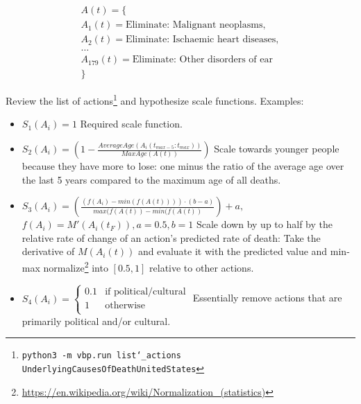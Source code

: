 \documentclass[12pt, a4paper, twocolumn]{article}
\begin{document}
\begin{equation*}
  \begin{gathered}
    A(t) = \{\\
    A_1(t) = \textrm{Eliminate: Malignant neoplasms},\\
    A_2(t) = \textrm{Eliminate: Ischaemic heart diseases},\\
    \textrm{\ldots}\\
    A_{179}(t) = \textrm{Eliminate: Other disorders of ear}\\
    \}
  \end{gathered}
\end{equation*}

Review the list of actions\footnote{\texttt{python3 -m vbp.run list\char`_actions UnderlyingCausesOfDeathUnitedStates}} and hypothesize scale functions. Examples:

\begin{itemize}
  \item $S_1(A_i) = 1$
                  \newline\newline
                  Required scale function.
  \item $S_2(A_i) = \left(1 - \frac{AverageAge(A_i(t_{max-5}:t_{max}))}{MaxAge(A(t))}\right)$
                  \newline\newline
                  Scale towards younger people because they have more to lose: one minus the ratio of the average age over the last 5 years compared to the maximum age of all deaths.
  \item $S_3(A_i) = \left(\frac{(f(A_i)-min(f(A(t)))) \cdot (b-a)}{max(f(A(t))-min(f(A(t))}\right) + a,$
                  \newline\newline
                  $f(A_i) = M'(A_i(t_F)), a=0.5, b=1$
                  \newline\newline
                  Scale down by up to half by the relative rate of change of an action's predicted rate of death: Take the derivative of $M(A_i(t))$ and evaluate it with the predicted value and min-max normalize\footnote{\scriptsize{\url{https://en.wikipedia.org/wiki/Normalization_(statistics)}}} into $[0.5,1]$ relative to other actions.
  \item $S_4(A_i) = \begin{cases}\text{0.1} & \mbox{if political/cultural} \\ \text{1} & \mbox{otherwise} \\ \end{cases}$
                  \newline\newline
                  Essentially remove actions that are primarily political and/or cultural.
\end{itemize}
\end{document}
